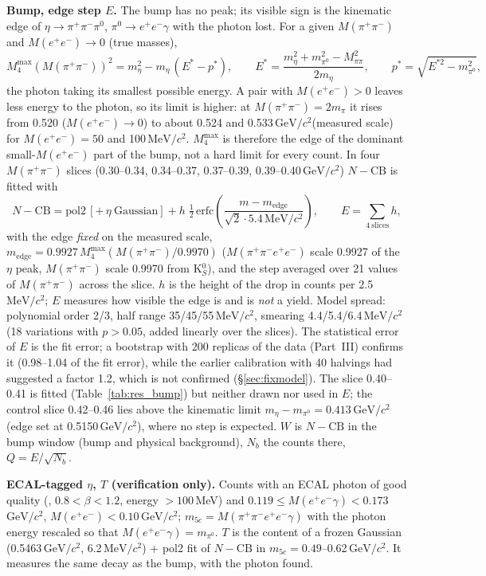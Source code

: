 \documentclass[11pt,a4paper]{article}
\newcommand{\piz}{\ensuremath{\pi^{0}}\xspace}
\newcommand{\ee}{\ensuremath{e^{+}e^{-}}\xspace}
\newcommand{\pipi}{\ensuremath{\pi^{+}\pi^{-}}\xspace}
\newcommand{\ppee}{\ensuremath{\pi^{+}\pi^{-}e^{+}e^{-}}\xspace}
\newcommand{\Mfour}{\ensuremath{M(\pi^{+}\pi^{-}e^{+}e^{-})}\xspace}
\newcommand{\Mee}{\ensuremath{M(e^{+}e^{-})}\xspace}
\newcommand{\Mpipi}{\ensuremath{M(\pi^{+}\pi^{-})}\xspace}
\newcommand{\GeVcc}{\ensuremath{\mathrm{GeV}/c^{2}}\xspace}
\newcommand{\MeVcc}{\ensuremath{\mathrm{MeV}/c^{2}}\xspace}
\newcommand{\code}[1]{\texttt{\detokenize{#1}}}
\begin{document}
\textbf{Bump, edge step $E$.} The bump has no peak; its visible sign is the kinematic edge of
$\eta\to\pipi\piz$, $\piz\to\ee\gamma$ with the photon lost. For a given \Mpipi and $\Mee\to0$ (true masses),
\begin{equation}
M_4^{\max}(\Mpipi)^2=m_\eta^2-m_\eta\,(E^*-p^*),\qquad E^*=\frac{m_\eta^2+m_{\pi^0}^2-M_{\pi\pi}^2}{2m_\eta},\qquad
p^*=\sqrt{E^{*2}-m_{\pi^0}^2},
\label{eq:m4max}
\end{equation}
the photon taking its smallest possible energy. A pair with $\Mee>0$ leaves less energy to the photon, so its
limit is higher: at $\Mpipi=2m_\pi$ it rises from 0.520 ($\Mee\to0$) to about 0.524 and 0.533\,\GeVcc (measured scale)
for $\Mee=50$ and 100\,\MeVcc. $M_4^{\max}$ is therefore the edge of the dominant small-\Mee part of the bump, not a
hard limit for every count. In four \Mpipi slices (0.30--0.34, 0.34--0.37, 0.37--0.39, 0.39--0.40\,\GeVcc)
$N-\mathrm{CB}$ is fitted with
\begin{equation}
N-\mathrm{CB} = \mathrm{pol2}\,[+\,\eta\ \text{Gaussian}] + h\;\tfrac12\,\mathrm{erfc}\!\left(\frac{m-m_{\mathrm{edge}}}{\sqrt2\cdot5.4\,\mathrm{MeV}/c^2}\right),
\qquad E=\sum_{4\ \text{slices}} h ,
\label{eq:edge}
\end{equation}
with the edge \emph{fixed} on the measured scale, $m_{\mathrm{edge}}=0.9927\,M_4^{\max}(\Mpipi/0.9970)$ (\Mfour scale
0.9927 of the $\eta$ peak, \Mpipi scale 0.9970 from K$^0_S$), and the step averaged over 21 values of \Mpipi
across the slice. $h$ is the height of the drop in counts per 2.5\,\MeVcc; $E$
measures how visible the edge is and is \emph{not} a yield. Model spread: polynomial order 2/3, half range
35/45/55\,\MeVcc, smearing 4.4/5.4/6.4\,\MeVcc (18 variations with $p>0.05$, added linearly over the slices). The
statistical error of $E$ is the fit error; a bootstrap with 200 replicas of the data (Part~III) confirms it (0.98--1.04 of the fit
error), while the earlier calibration with 40 halvings had suggested a factor 1.2, which is not confirmed (\S\ref{sec:fixmodel}). The slice 0.40--0.41 is fitted (Table~\ref{tab:res_bump}) but neither drawn nor
used in $E$; the control slice 0.42--0.46 lies above the kinematic limit
$m_\eta-m_{\pi^0}=0.413$\,\GeVcc (edge set at 0.5150\,\GeVcc), where no step is expected. $W$ is $N-\mathrm{CB}$ in
the bump window (bump and physical background), $N_b$ the counts there, $Q=E/\sqrt{N_b}$.

\textbf{ECAL-tagged $\eta$, $T$ (verification only).} Counts with an ECAL photon of good quality (\code{ecal_pid},
$0.8<\beta<1.2$, energy $>100$\,MeV) and $0.119\le M(\ee\gamma)<0.173$\,\GeVcc, $\Mee<0.10$\,\GeVcc;
$m_{5c}=M(\ppee\gamma)$ with the photon energy rescaled so that $M(\ee\gamma)=m_{\pi^0}$. $T$ is the content of a
frozen Gaussian (0.5463\,\GeVcc, 6.2\,\MeVcc) + pol2 fit of $N-\mathrm{CB}$ in $m_{5c}=0.49$--0.62\,\GeVcc. It measures
the same decay as the bump, with the photon found.
\end{document}

